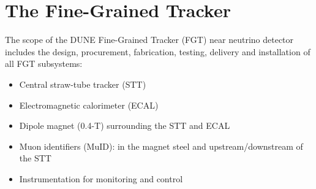 \section{The Fine-Grained Tracker} 
\label{cdrsec:detectors-nd-ref}

The scope of the DUNE Fine-Grained Tracker (FGT) near neutrino
detector includes the design, procurement, fabrication, testing,
delivery and installation of all FGT subsystems:
\begin{itemize}
\item Central straw-tube tracker (STT)
\item Electromagnetic calorimeter (ECAL) 
\item Dipole magnet (0.4-T) surrounding the STT and ECAL
\item Muon identifiers (MuID): in the magnet steel and upstream/downstream of the STT
\item Instrumentation for monitoring and control
\end{itemize}



